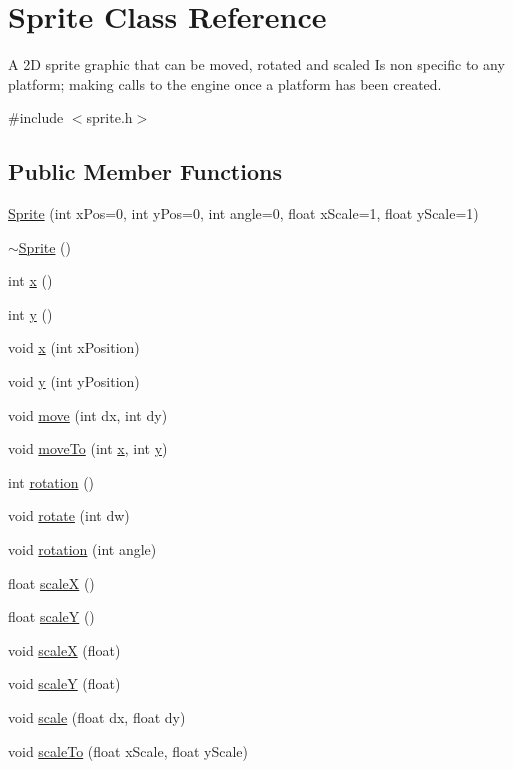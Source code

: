 \hypertarget{class_sprite}{\section{Sprite Class Reference}
\label{class_sprite}
}


A 2\-D sprite graphic that can be moved, rotated and scaled Is non specific to any platform; making calls to the engine once a platform has been created.  




{\ttfamily \#include $<$sprite.\-h$>$}

\subsection*{Public Member Functions}
\begin{DoxyCompactItemize}
\item 
\hyperlink{class_sprite_a95a52b9a6911e359de3064fa6d3a5617}{Sprite} (int x\-Pos=0, int y\-Pos=0, int angle=0, float x\-Scale=1, float y\-Scale=1)
\item 
\hyperlink{class_sprite_a8accab430f9d90ae5117b57d67e32b84}{$\sim$\-Sprite} ()
\item 
int \hyperlink{class_sprite_a94fe4c517497ba88a93b73cde72b29e8}{x} ()
\item 
int \hyperlink{class_sprite_a2c5cebdd000b4c406432da3ce3a71cd6}{y} ()
\item 
void \hyperlink{class_sprite_ad8d8da2bddcc3819ad6c1c43384b0349}{x} (int x\-Position)
\item 
void \hyperlink{class_sprite_a3cc9eb64901a1b5a109a3fd1c7f548b5}{y} (int y\-Position)
\item 
void \hyperlink{class_sprite_a2b89a3db5c84c3ae082cf71ec292f18b}{move} (int dx, int dy)
\item 
void \hyperlink{class_sprite_a751b76bd42d5f922cee4f6890003b849}{move\-To} (int \hyperlink{class_sprite_a94fe4c517497ba88a93b73cde72b29e8}{x}, int \hyperlink{class_sprite_a2c5cebdd000b4c406432da3ce3a71cd6}{y})
\item 
int \hyperlink{class_sprite_a6e4553db94d974d88543b5a658f6c0c7}{rotation} ()
\item 
void \hyperlink{class_sprite_a52ff92ae9e183b44153f1832b0fe8d9c}{rotate} (int dw)
\item 
void \hyperlink{class_sprite_aceb65d178240d6abf04cd9c27ed0e095}{rotation} (int angle)
\item 
float \hyperlink{class_sprite_a2163af37f17518f7c2a294f8ecc12b1d}{scale\-X} ()
\item 
float \hyperlink{class_sprite_a683509398c5d1098b0503eb223dd21f5}{scale\-Y} ()
\item 
void \hyperlink{class_sprite_ae03819f524c4b85cc2b735a677ff6c25}{scale\-X} (float)
\item 
void \hyperlink{class_sprite_a874153ccccd9304af8d7c19c51dedd74}{scale\-Y} (float)
\item 
void \hyperlink{class_sprite_a09ad4f5df5c625c44e31f02e625a40d0}{scale} (float dx, float dy)
\item 
void \hyperlink{class_sprite_a625a3ba4a2e647cf1a4d88afe9237bb3}{scale\-To} (float x\-Scale, float y\-Scale)
\end{DoxyCompactItemize}
